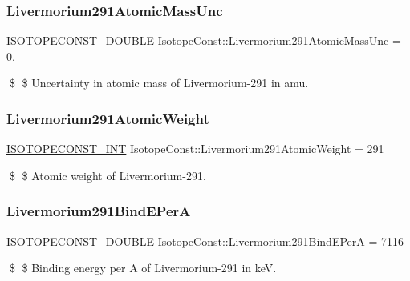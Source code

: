 \subsubsection{\texorpdfstring{Livermorium291\+Atomic\+Mass\+Unc}{Livermorium291AtomicMassUnc}}
{\footnotesize\ttfamily \mbox{\hyperlink{group___isotope_const-_macros_ga8f45a7272ce02c0b4c65c44636ed719a}{I\+S\+O\+T\+O\+P\+E\+C\+O\+N\+S\+T\+\_\+\+D\+O\+U\+B\+LE}} Isotope\+Const\+::\+Livermorium291\+Atomic\+Mass\+Unc = 0.}

\$ \$ Uncertainty in atomic mass of Livermorium-\/291 in amu. \mbox{\label{group___isotope_const-_livermorium-_lv291_ga5b7573df0e3f9b3e5298613d50cafa41}} 
\subsubsection{\texorpdfstring{Livermorium291\+Atomic\+Weight}{Livermorium291AtomicWeight}}
{\footnotesize\ttfamily \mbox{\hyperlink{group___isotope_const-_macros_ga5f18360b3e99483a35c32d789e62621c}{I\+S\+O\+T\+O\+P\+E\+C\+O\+N\+S\+T\+\_\+\+I\+NT}} Isotope\+Const\+::\+Livermorium291\+Atomic\+Weight = 291}

\$ \$ Atomic weight of Livermorium-\/291. \mbox{\label{group___isotope_const-_livermorium-_lv291_ga11086cadb6c8d0fbc7192febe0a54820}} 
\subsubsection{\texorpdfstring{Livermorium291\+Bind\+E\+PerA}{Livermorium291BindEPerA}}
{\footnotesize\ttfamily \mbox{\hyperlink{group___isotope_const-_macros_ga8f45a7272ce02c0b4c65c44636ed719a}{I\+S\+O\+T\+O\+P\+E\+C\+O\+N\+S\+T\+\_\+\+D\+O\+U\+B\+LE}} Isotope\+Const\+::\+Livermorium291\+Bind\+E\+PerA = 7116}

\$ \$ Binding energy per A of Livermorium-\/291 in keV. \mbox{\label{group___isotope_const-_livermorium-_lv291_gad84f19010135cdbdcab4dd811708bbb5}} 
